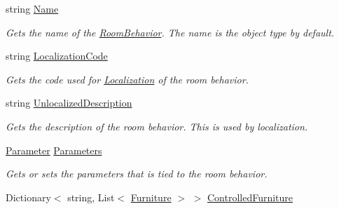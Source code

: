 \begin{DoxyCompactItemize}
string \hyperlink{class_project_porcupine_1_1_rooms_1_1_room_behavior_a283c9dd902ca5806b8f672f27ca6eb98}{Name}
\begin{DoxyCompactList}\small\item\em Gets the name of the \hyperlink{class_project_porcupine_1_1_rooms_1_1_room_behavior}{Room\+Behavior}. The name is the object type by default. \end{DoxyCompactList}\item 
string \hyperlink{class_project_porcupine_1_1_rooms_1_1_room_behavior_aa7bf0c23e20fde63d0ed6018c8a11884}{Localization\+Code}
\begin{DoxyCompactList}\small\item\em Gets the code used for \hyperlink{namespace_project_porcupine_1_1_localization}{Localization} of the room behavior. \end{DoxyCompactList}\item 
string \hyperlink{class_project_porcupine_1_1_rooms_1_1_room_behavior_aeb1f7869f4a6ab5600a9320acf2978f3}{Unlocalized\+Description}
\begin{DoxyCompactList}\small\item\em Gets the description of the room behavior. This is used by localization. \end{DoxyCompactList}\item 
\hyperlink{class_parameter}{Parameter} \hyperlink{class_project_porcupine_1_1_rooms_1_1_room_behavior_a96a65a8b1a6df3f917b693e996eba5a1}{Parameters}
\begin{DoxyCompactList}\small\item\em Gets or sets the parameters that is tied to the room behavior. \end{DoxyCompactList}\item 
Dictionary$<$ string, List$<$ \hyperlink{class_furniture}{Furniture} $>$ $>$ \hyperlink{class_project_porcupine_1_1_rooms_1_1_room_behavior_ad30cb9e324be3e4eb582015e2c25c77a}{Controlled\+Furniture}
\end{DoxyCompactItemize}
